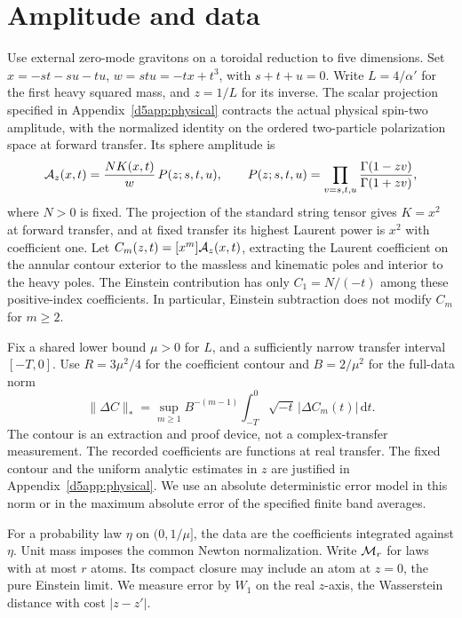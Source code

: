 \documentclass[11pt]{article}
\begin{document}
\section{Amplitude and data}
Use external zero-mode gravitons on a toroidal reduction to five dimensions. Set \(x=-st-su-tu\), \(w=stu=-tx+t^3\), with \(s+t+u=0\). Write \(L=4/\alpha'\) for the first heavy squared mass, and \(z=1/L\) for its inverse. The scalar projection specified in Appendix~\ref{d5app:physical} contracts the actual physical spin-two amplitude, with the normalized identity on the ordered two-particle polarization space at forward transfer. Its sphere amplitude is
\begin{equation}
 {\cal A}_z(x,t)=\frac{NK(x,t)}{w}\,P(z;s,t,u),\qquad
 P(z;s,t,u)=\prod_{v=s,t,u}\frac{\Gamma(1-zv)}{\Gamma(1+zv)} ,
 \label{eq:amplitude}
\end{equation}
where \(N>0\) is fixed. The projection of the standard string tensor \cite{CHLi} gives \(K=x^2\) at forward transfer, and at fixed transfer its highest Laurent power is \(x^2\) with coefficient one. Let \(C_m(z,t)=[x^m]{\cal A}_z(x,t)\), extracting the Laurent coefficient on the annular contour exterior to the massless and kinematic poles and interior to the heavy poles. The Einstein contribution has only \(C_1=N/(-t)\) among these positive-index coefficients. In particular, Einstein subtraction does not modify \(C_m\) for \(m\ge2\).

Fix a shared lower bound \(\mu>0\) for \(L\), and a sufficiently narrow transfer interval \([-T,0]\). Use \(R=3\mu^2/4\) for the coefficient contour and \(B=2/\mu^2\) for the full-data norm
\begin{equation}
 \|\Delta C\|_*=\sup_{m\ge1}B^{-(m-1)}
 \int_{-T}^0\sqrt{-t}\,|\Delta C_m(t)|\,\mathrm{d}t .
 \label{eq:norm}
\end{equation}
The contour is an extraction and proof device, not a complex-transfer measurement. The recorded coefficients are functions at real transfer. The fixed contour and the uniform analytic estimates in \(z\) are justified in Appendix~\ref{d5app:physical}. We use an absolute deterministic error model in this norm or in the maximum absolute error of the specified finite band averages.

For a probability law \(\eta\) on \((0,1/\mu]\), the data are the coefficients integrated against \(\eta\). Unit mass imposes the common Newton normalization. Write \({\cal M}_r\) for laws with at most \(r\) atoms. Its compact closure may include an atom at \(z=0\), the pure Einstein limit. We measure error by \(W_1\) on the real \(z\)-axis, the Wasserstein distance with cost \(|z-z'|\).
\end{document}
